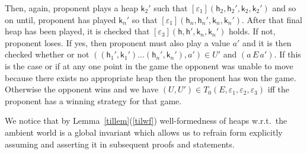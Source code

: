\documentclass[nocopyrightspace,preprint]{sigplanconf}
\newcommand{\eff}{\varepsilon}
\newcommand\E{\ensuremath{\,E\,}\xspace}
\newcommand\heap{\ensuremath{\mathsf{h}}\xspace}
\newcommand\h{\heap}
\renewcommand\k{\ensuremath{\mathsf{k}}\xspace}
\newcommand{\tup}[1]{(#1)}
\begin{document}
 Then, again, proponent plays a heap
$\k_2'$ such that $[\eff_1](\h_2,\h_2',\k_2,\k_2')$ and so on until,
proponent has played $\k_n'$ so that
$[\eff_1](\h_{n},\h_n',\k_n,\k_n')$. After that final heap has been played, it is checked that $[\eff_3](\h,\h',\k_n,\k_n')$ holds. If not, proponent loses. If yes, then  proponent must also
play a value $a'$ and it is then checked whether or not
$\tup{(\h_1',\k_1')\ldots (\h_n',\k_n'),a'}\in U'$ and $(a \E a')$. If
this is the case or if at any one point in the game the opponent was
unable to move because there exists no appropriate heap then the
proponent has won the game. Otherwise the opponent wins and we have
$(U,U')\in T_0(E,\eff_1,\eff_2,\eff_3)$ iff the proponent has a
winning strategy for that game.

We notice that by Lemma~\ref{tillem}(\ref{tilwf}) well-formedness of
heaps w.r.t.\ the ambient world is a global invariant which allows us
to refrain form explicitly assuming and asserting it in subsequent
proofs and statements.
\end{document}
